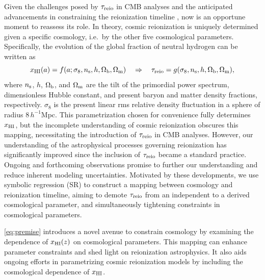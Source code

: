 Given the challenges posed by $\tau_{\mathrm{reio}}$ in CMB analyses and the
anticipated advancements in constraining the reionization timeline
\cite{Montero2021, Hera2022}, now is an opportune moment to reassess its
role.
In theory, cosmic reionization is uniquely determined given a specific
cosmology, i.e.\ by the other five cosmological parameters.
Specifically, the evolution of the global fraction of neutral hydrogen
can be written as
%
\begin{equation}
\label{eq:premise}
x_{\mathrm{HI}}(a) = f(a; \sigma_8, n_\mathrm{s}, h, \Omega_\mathrm{b}, \Omega_\mathrm{m})
\quad \Rightarrow \quad
\tau_{\mathrm{reio}} = g(\sigma_8, n_\mathrm{s}, h, \Omega_\mathrm{b}, \Omega_\mathrm{m}),
\end{equation}
%
where $n_\mathrm{s}$, $h$, $\Omega_\mathrm{b}$, and $\Omega_\mathrm{m}$ are the tilt of the
primordial power spectrum, dimensionless Hubble constant, and present
baryon and matter density fractions, respectively.
$\sigma_8$ is the present linear rms relative density fluctuation in a
sphere of radius $8 \, h^{-1}$Mpc.
This parametrization chosen for convenience fully determines $x_{\mathrm{HI}}$,
but the incomplete understanding of cosmic reionization obscures this
mapping, necessitating the introduction of $\tau_{\mathrm{reio}}$ in CMB analyses.
However, our understanding of the astrophysical processes governing
reionization has significantly improved \cite{Gnedin2022, Kannan2022,
Murray2020, Fan2023} since the inclusion of $\tau_{\mathrm{reio}}$ became a
standard practice.
Ongoing and forthcoming observations promise to further our
understanding and reduce inherent modeling uncertainties.
Motivated by these developments, we use symbolic regression (SR)
\cite{Cranmer2023} to construct a mapping between cosmology and
reionization timeline, aiming to demote $\tau_{\mathrm{reio}}$ from an independent
to a derived cosmological parameter, and simultaneously tightening
constraints in cosmological parameters.

\cref{eq:premise} introduces a novel avenue to constrain cosmology
by examining the dependence of $x_{\mathrm{HI}}(z)$ on cosmological parameters.
This mapping can enhance parameter constraints and shed light on
reionization astrophysics.
It also aids ongoing efforts in parametrizing cosmic reionization models
\cite{Trac2018,Trac2022,Paoletti2024} by including the cosmological dependence of
$x_{\mathrm{HI}}$.


